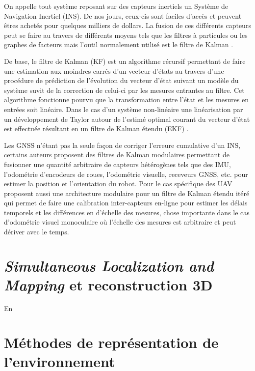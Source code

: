 On appelle tout système reposant sur des capteurs inertiels un Système de Navigation Inertiel (INS). De nos jours, ceux-cis sont faciles d'accès et peuvent êtres achetés pour quelques milliers de dollars. La fusion de ces différents capteurs peut se faire au travers de différents moyens tels que les filtres à particules \citep{Carvalho1997} ou les graphes de facteurs \citep{Indelman2012} mais l'outil normalement utilisé est le filtre de Kalman \citep{Noureldin2013}.

De base, le filtre de Kalman (KF) est un algorithme récursif permettant de faire une estimation aux moindres carrés d'un vecteur d'états au travers d'une procédure de prédiction de l'évolution du vecteur d'état suivant un modèle du système suvit de la correction de celui-ci par les mesures entrantes au filtre. Cet algorithme fonctionne pourvu que la transformation entre l'état et les mesures en entrées soit linéaire. Dans le cas d'un système non-linéaire une linéarisation par un développement de Taylor autour de l'estimé optimal courant du vecteur d'état est effectuée résultant en un filtre de Kalman étendu (EKF) \citep{Chui2017}.

Les GNSS n'étant pas la seule façon de corriger l'erreure cumulative d'un INS, certains auteurs proposent des filtres de Kalman modulaires permettant de fusionner une quantité arbitraire de capteurs hétérogènes tels que des IMU, l'odométrie d'encodeurs de roues, l'odométrie visuelle, receveurs GNSS, etc. \citep{MooreEkf2014} pour estimer la position et l'orientation du robot. Pour le cas spécifique des UAV \citep{Lynen2013} proposent aussi une architecture modulaire pour un filtre de Kalman étendu itéré qui permet de faire une calibration inter-capteurs en-ligne pour estimer les délais temporels et les différences en d'échelle des mesures, chose importante dans le cas d'odométrie visuel monoculaire où l'échelle des mesures est arbitraire et peut dériver avec le temps.

\section{\textit{Simultaneous Localization and Mapping} et reconstruction 3D}\label{subsec:reconstruction}

En

\section{Méthodes de représentation de l'environnement}\label{subsec:representations}


